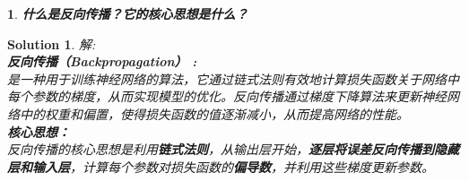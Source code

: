 \documentclass{article}
\theoremstyle{Problem}
\newtheorem{prob}{}
\theoremstyle{Solution}
\newtheorem*{sol}{Solution}
\begin{document}
	\newpage
	
	\begin{prob}
		\textbf{什么是反向传播？它的核心思想是什么？}
	\end{prob}
	
	\begin{sol}
		解:\\
		\textbf{反向传播（Backpropagation） :}\\是一种用于训练神经网络的算法，它通过链式法则有效地计算损失函数关于网络中每个参数的梯度，从而实现模型的优化。反向传播通过梯度下降算法来更新神经网络中的权重和偏置，使得损失函数的值逐渐减小，从而提高网络的性能。\\
		\textbf{核心思想：}\\
		反向传播的核心思想是利用\textbf{链式法则}，从输出层开始，\textbf{逐层将误差反向传播到隐藏层和输入层}，计算每个参数对损失函数的\textbf{偏导数}，并利用这些梯度更新参数。
	\end{sol}
	
\end{document}
